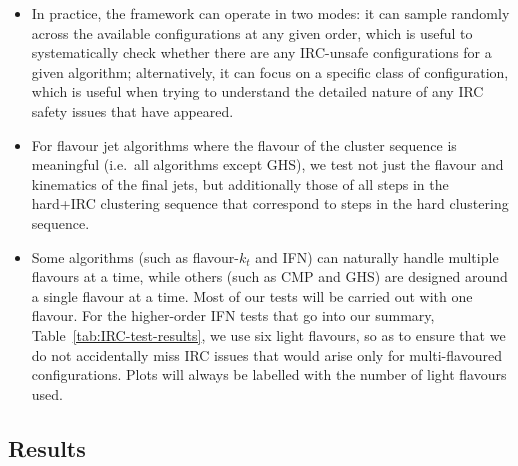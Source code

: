 \documentclass[nofootinbib,twocolumn,preprintnumbers,superscriptaddress,aps]{revtex4-2}
\begin{document}
\begin{itemize}
\item %
  In practice, the framework can operate in two modes: it can sample
  randomly across the available configurations at any given order,
  which is useful to systematically check whether there are any IRC-unsafe configurations for a given algorithm; alternatively, it can
  focus on a specific class of configuration, which is useful when
  trying to understand the detailed nature of any IRC safety issues
  that have appeared.
\item For flavour jet algorithms where the flavour of the cluster
  sequence is meaningful (i.e.\ all algorithms except GHS), we test
  not just the flavour and kinematics of the final jets, but
  additionally those of all steps in the hard+IRC clustering sequence
  that correspond to steps in the hard clustering sequence.
\item Some algorithms (such as flavour-$k_t$ and IFN) can naturally
  handle multiple flavours at a time, while others (such as CMP and
  GHS) are designed around a single flavour at a time.
  Most of our tests will be carried out with one flavour.
  For the higher-order IFN tests that go into our summary,
  Table~\ref{tab:IRC-test-results}, we use six light flavours, so
  as to ensure that we do not accidentally miss IRC issues that would
  arise only for multi-flavoured configurations.
  Plots will always be labelled with the number of light flavours
  used.
\end{itemize}

\subsection{Results}
\label{sec:IRC-results}
\end{document}

